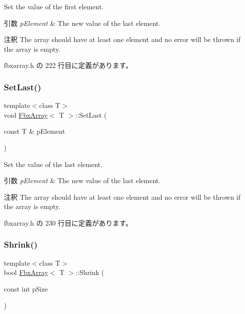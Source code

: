 Set the value of the first element. 
\begin{DoxyParams}{引数}
{\em p\+Element} & The new value of the last element. \\
\hline
\end{DoxyParams}
\begin{DoxyRemark}{注釈}
The array should have at least one element and no error will be thrown if the array is empty. 
\end{DoxyRemark}


 fbxarray.\+h の 222 行目に定義があります。

\mbox{\label{class_fbx_array_ae7fe05cc12ae00d74dd8db0ea8b6ca31}} 
\subsubsection{\texorpdfstring{Set\+Last()}{SetLast()}}
{\footnotesize\ttfamily template$<$class T$>$ \\
void \hyperlink{class_fbx_array}{Fbx\+Array}$<$ T $>$\+::Set\+Last (\begin{DoxyParamCaption}\item[{const T \&}]{p\+Element }\end{DoxyParamCaption})\hspace{0.3cm}{\ttfamily [inline]}}

Set the value of the last element. 
\begin{DoxyParams}{引数}
{\em p\+Element} & The new value of the last element. \\
\hline
\end{DoxyParams}
\begin{DoxyRemark}{注釈}
The array should have at least one element and no error will be thrown if the array is empty. 
\end{DoxyRemark}


 fbxarray.\+h の 230 行目に定義があります。

\mbox{\label{class_fbx_array_a252df10a0b24e15b515be15dcbfb6e0a}} 
\subsubsection{\texorpdfstring{Shrink()}{Shrink()}}
{\footnotesize\ttfamily template$<$class T$>$ \\
bool \hyperlink{class_fbx_array}{Fbx\+Array}$<$ T $>$\+::Shrink (\begin{DoxyParamCaption}\item[{const int}]{p\+Size }\end{DoxyParamCaption})\hspace{0.3cm}{\ttfamily [inline]}}

